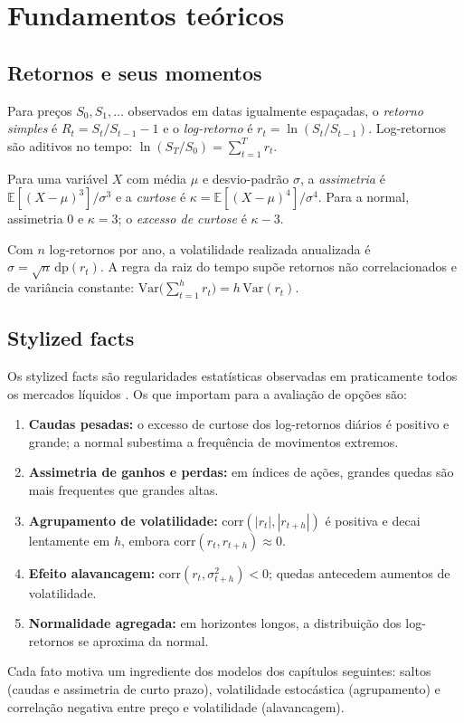 \section{Fundamentos teóricos}

\subsection{Retornos e seus momentos}

\begin{definicao}[Retornos]
Para preços $S_0,S_1,\dots$ observados em datas igualmente espaçadas, o \emph{retorno simples} é $R_t=S_t/S_{t-1}-1$ e o \emph{log-retorno} é $r_t=\ln(S_t/S_{t-1})$. Log-retornos são aditivos no tempo: $\ln(S_T/S_0)=\sum_{t=1}^T r_t$.
\end{definicao}

\begin{definicao}
Para uma variável $X$ com média $\mu$ e desvio-padrão $\sigma$, a \emph{assimetria} é $\mathbb E[(X-\mu)^3]/\sigma^3$ e a \emph{curtose} é $\kappa=\mathbb E[(X-\mu)^4]/\sigma^4$. Para a normal, assimetria $0$ e $\kappa=3$; o \emph{excesso de curtose} é $\kappa-3$.
\end{definicao}

\begin{definicao}
Com $n$ log-retornos por ano, a volatilidade realizada anualizada é $\hat\sigma=\sqrt{n}\,\mathrm{dp}(r_t)$. A regra da raiz do tempo supõe retornos não correlacionados e de variância constante: $\mathrm{Var}\big(\sum_{t=1}^h r_t\big)=h\,\mathrm{Var}(r_t)$.
\end{definicao}

\subsection{Stylized facts}

Os stylized facts são regularidades estatísticas observadas em praticamente todos os mercados líquidos \citep{cont2001}. Os que importam para a avaliação de opções são:
\begin{enumerate}
\item \textbf{Caudas pesadas:} o excesso de curtose dos log-retornos diários é positivo e grande; a normal subestima a frequência de movimentos extremos.
\item \textbf{Assimetria de ganhos e perdas:} em índices de ações, grandes quedas são mais frequentes que grandes altas.
\item \textbf{Agrupamento de volatilidade:} $\mathrm{corr}(|r_t|,|r_{t+h}|)$ é positiva e decai lentamente em $h$, embora $\mathrm{corr}(r_t,r_{t+h})\approx0$.
\item \textbf{Efeito alavancagem:} $\mathrm{corr}(r_t,\sigma^2_{t+h})<0$; quedas antecedem aumentos de volatilidade.
\item \textbf{Normalidade agregada:} em horizontes longos, a distribuição dos log-retornos se aproxima da normal.
\end{enumerate}
Cada fato motiva um ingrediente dos modelos dos capítulos seguintes: saltos (caudas e assimetria de curto prazo), volatilidade estocástica (agrupamento) e correlação negativa entre preço e volatilidade (alavancagem).

